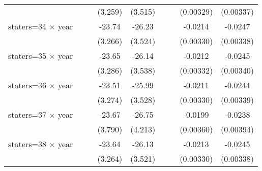 {\begin{longtable}{l*{8}{c}}
                    &                     &                     &     (3.259)         &     (3.515)         &                     &                     &   (0.00329)         &   (0.00337)         \\
[1em]
staters=34 $\times$ year&                     &                     &      -23.74\sym{***}&      -26.23\sym{***}&                     &                     &     -0.0214\sym{***}&     -0.0247\sym{***}\\
                    &                     &                     &     (3.266)         &     (3.524)         &                     &                     &   (0.00330)         &   (0.00338)         \\
[1em]
staters=35 $\times$ year&                     &                     &      -23.65\sym{***}&      -26.14\sym{***}&                     &                     &     -0.0212\sym{***}&     -0.0245\sym{***}\\
                    &                     &                     &     (3.286)         &     (3.538)         &                     &                     &   (0.00332)         &   (0.00340)         \\
[1em]
staters=36 $\times$ year&                     &                     &      -23.51\sym{***}&      -25.99\sym{***}&                     &                     &     -0.0211\sym{***}&     -0.0244\sym{***}\\
                    &                     &                     &     (3.274)         &     (3.528)         &                     &                     &   (0.00330)         &   (0.00339)         \\
[1em]
staters=37 $\times$ year&                     &                     &      -23.67\sym{***}&      -26.75\sym{***}&                     &                     &     -0.0199\sym{***}&     -0.0238\sym{***}\\
                    &                     &                     &     (3.790)         &     (4.213)         &                     &                     &   (0.00360)         &   (0.00394)         \\
[1em]
staters=38 $\times$ year&                     &                     &      -23.64\sym{***}&      -26.13\sym{***}&                     &                     &     -0.0213\sym{***}&     -0.0245\sym{***}\\
                    &                     &                     &     (3.264)         &     (3.521)         &                     &                     &   (0.00330)         &   (0.00338)         \\

\end{longtable}}
